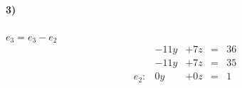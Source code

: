 \documentclass[palatino,nosec]{Docencia}
\begin{document}
\begin{problem}
\paragraph{3)} $e_3=e_3-e_2$
\[
\begin{array}{lcccl}
&-11y&+7z&=&36\\
&-11y&+7z&=&35\\
\hline
e_2:   & 0y&+0z&=&1\\
\end{array}
\]	



\end{problem}
\end{document}
